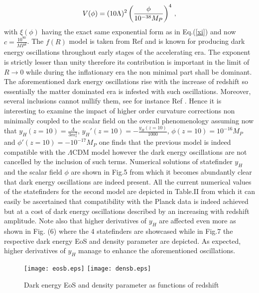\documentclass[aps,prd,twocolumn,groupedaddress,showpacs,nofootinbib,amssymb]{revtex4-2}
\begin{document}
\begin{equation}
\centering
\label{V2}
V(\phi)=(10\Lambda)^2\left(\frac{\phi}{10^{-38}M_P}\right)^4\, ,
\end{equation}
with $\xi(\phi)$ having the exact same exponential form as in Eq.(\ref{xi}) and now $c=\frac{10^{90}}{MP^2}$. The $f(R)$ model is taken from Ref \cite{Odintsov:2020nwm} and is known for producing dark energy oscillations throughout early stages of the accelerating era. The exponent is strictly lesser than unity therefore its contribution is important in the limit of $R\to0$ while during the inflationary era the non minimal part shall be dominant. The aforementioned dark energy oscillations rise with the increase of redshift so essentially the matter dominated era is infested with such oscillations. Moreover, several inclusions cannot nullify them, see for instance Ref \cite{Odintsov:2020nwm,Odintsov:2021nim}. Hence it is interesting to examine the impact of higher order curvature corrections non minimally coupled to the scalar field on the overall phenomenology assuming now that $y_H(z=10)=\frac{\Lambda}{3m_s^2}$, $y_H'(z=10)=-\frac{y_H(z=10)}{1000}$, $\phi(z=10)=10^{-16}M_P$ and $\phi'(z=10)=-10^{-17}M_P$ one finds that the previous model is indeed compatible with the $\Lambda$CDM model however the dark energy oscillations are not cancelled by the inclusion of such terms. Numerical solutions of statefinder $y_H$ and the scalar field $\phi$ are shown in Fig.5 from which it becomes abundantly clear that dark energy oscillations are indeed present. All the current numerical values of the statefinders for the second model are depicted in Table.II from which it can easily be ascertained that compatibility with the Planck data \cite{Aghanim:2018eyx} is indeed achieved but at a cost of dark energy oscillations described by an increasing with redshift amplitude. Note also that higher derivatives of $y_H$ are affected even more as shown in Fig. (6) where the 4 statefinders are showcased while in Fig.7 the respective dark energy EoS and density parameter are depicted. As expected, higher derivatives of $y_H$ manage to enhance the aforementioned oscillations.

\begin{figure}[h!]
\centering
\label{plot7}
\texttt{[image: eosb.eps]}
\texttt{[image: densb.eps]}
\caption{Dark energy EoS and density parameter as functions of redshift}
\end{figure}
\end{document}
